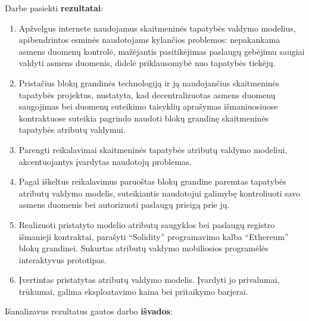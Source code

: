 
Darbe pasiekti \textbf{rezultatai}:

\begin{enumerate}
    \item Apžvelgus internete
    naudojamus skaitmeninės tapatybės valdymo modelius, apibendrintos esminės naudotojams kylančios problemos: nepakankama asmens duomenų
    kontrolė, mažėjantis pasitikėjimas paslaugų gebėjimu saugiai valdyti asmens duomenis, didelė priklausomybė nuo tapatybės tiekėjų.
    \item Pristačius blokų grandinės technologiją ir ją naudojančius skaitmeninės tapatybės projektus, nustatyta, kad decentralizuotas
    asmens duomenų saugojimas bei duomenų suteikimo taisyklių aprašymas išmaniuosiuose kontraktuose
    suteikia pagrindo naudoti blokų grandinę skaitmeninės tapatybės atributų valdymui.
    \item Parengti reikalavimai skaitmeninės tapatybės atributų valdymo modeliui, akcentuojantys įvardytas naudotojų problemas.
    \item Pagal iškeltus reikalavimus paruoštas blokų grandine paremtas tapatybės atributų valdymo modelis, suteikiantis naudotojui galimybę kontroliuoti savo asmens duomenis
    bei autorizuoti paslaugų prieigą prie jų.
    \item Realizuoti pristatyto modelio atributų saugyklos bei paslaugų registro išmanieji kontraktai, parašyti \enquote{Solidity} programavimo kalba \enquote{Ethereum} blokų grandinei.
    Sukurtas atributų valdymo mobiliosios programėlės interaktyvus prototipas.
    \item Įvertintas pristatytas atributų valdymo modelis. Įvardyti jo privalumai, trūkumai,
    galima eksploatavimo kaina bei pritaikymo barjerai.
\end{enumerate}

\hfill \break
Išanalizavus rezultatus gautos darbo \textbf{išvados}:

